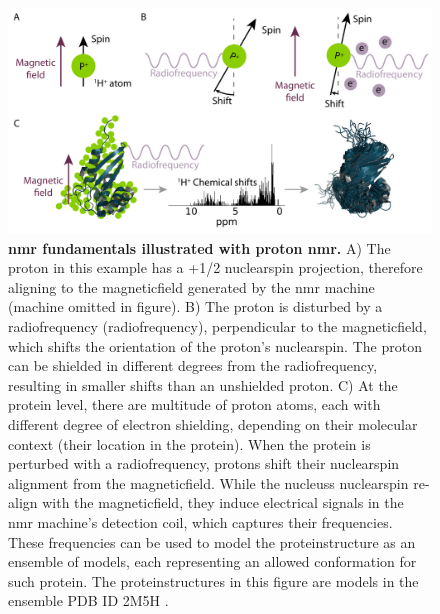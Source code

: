 \begin{figure}[tbh!]
    \centering
    \includegraphics[width=1\linewidth]{figures/nmr_guts.pdf}
    \caption{\textbf{\gls{nmr} fundamentals illustrated with \gls{proton} \gls{nmr}.} A) The \gls{proton} in this example has a +1/2 \gls{nuclearspin} projection, therefore aligning to the \gls{magneticfield} generated by the \gls{nmr} machine (machine omitted in figure). B) The \gls{proton} is disturbed by a radiofrequency (\gls{radiofrequency}), perpendicular to the \gls{magneticfield}, which shifts the orientation of the \gls{proton}'s \gls{nuclearspin}. The \gls{proton} can be shielded in different degrees from the \gls{radiofrequency}, resulting in smaller shifts than an unshielded \gls{proton}. C) At the protein level, there are multitude of \gls{proton} atoms, each with different degree of \gls{electron} shielding, depending on their molecular context (their location in the protein). When the protein is perturbed with a \gls{radiofrequency}, \glspl{proton} shift their \gls{nuclearspin} alignment from the \gls{magneticfield}. While the \glspl{nucleus} \gls{nuclearspin} re-align with the \gls{magneticfield}, they induce electrical signals in the \gls{nmr} machine's detection coil, which captures their frequencies. These frequencies can be used to model the \gls{proteinstructure} as an ensemble of models, each representing an allowed \gls{conformation} for such protein. The \glspl{proteinstructure} in this figure  are models in the ensemble PDB ID 2M5H \cite{ouyang_solution_2013}.}
    \label{fig:chapter1:nmr}
\end{figure}


